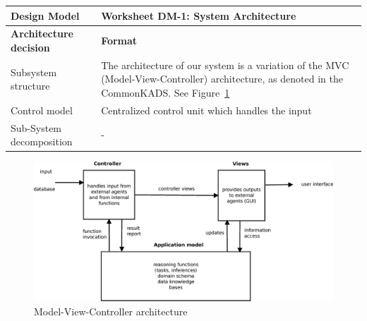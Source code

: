 \begin{tabular}%
		{|p{3cm}%
        |p{9cm}|}
\hline
\bf Design Model 	& \bf Worksheet DM-1: System Architecture \\
\hline\hline
\bf Architecture decision	& \bf Format \\ 
\hline
{\sc Subsystem structure}	& 
The architecture of our system is a variation of the MVC (Model-View-Controller) architecture, as denoted in the CommonKADS. See Figure~\ref{fig:MVC}
 \\
\hline
{\sc Control model} &
Centralized control unit which handles the input
\\
\hline
{\sc Sub-System decomposition} &
 - 
 \\
\hline
\end{tabular}

\begin{figure}[h]
\centering
\includegraphics[width=\textwidth]{images/mvc.eps}
\caption{Model-View-Controller architecture}
\label{fig:MVC}
\end{figure}